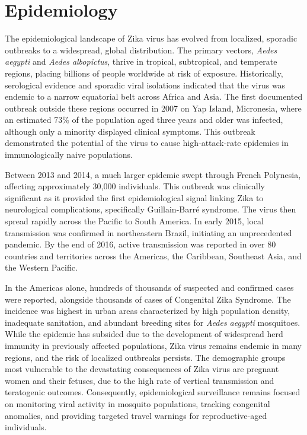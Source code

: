 \section*{Epidemiology}
The epidemiological landscape of Zika virus has evolved from localized, sporadic outbreaks to a widespread, global distribution. The primary vectors, \textit{Aedes aegypti} and \textit{Aedes albopictus}, thrive in tropical, subtropical, and temperate regions, placing billions of people worldwide at risk of exposure. Historically, serological evidence and sporadic viral isolations indicated that the virus was endemic to a narrow equatorial belt across Africa and Asia. The first documented outbreak outside these regions occurred in 2007 on Yap Island, Micronesia, where an estimated 73\% of the population aged three years and older was infected, although only a minority displayed clinical symptoms. This outbreak demonstrated the potential of the virus to cause high-attack-rate epidemics in immunologically naive populations.

Between 2013 and 2014, a much larger epidemic swept through French Polynesia, affecting approximately 30,000 individuals. This outbreak was clinically significant as it provided the first epidemiological signal linking Zika to neurological complications, specifically Guillain-Barr\'e syndrome. The virus then spread rapidly across the Pacific to South America. In early 2015, local transmission was confirmed in northeastern Brazil, initiating an unprecedented pandemic. By the end of 2016, active transmission was reported in over 80 countries and territories across the Americas, the Caribbean, Southeast Asia, and the Western Pacific.

In the Americas alone, hundreds of thousands of suspected and confirmed cases were reported, alongside thousands of cases of Congenital Zika Syndrome. The incidence was highest in urban areas characterized by high population density, inadequate sanitation, and abundant breeding sites for \textit{Aedes aegypti} mosquitoes. While the epidemic has subsided due to the development of widespread herd immunity in previously affected populations, Zika virus remains endemic in many regions, and the risk of localized outbreaks persists. The demographic groups most vulnerable to the devastating consequences of Zika virus are pregnant women and their fetuses, due to the high rate of vertical transmission and teratogenic outcomes. Consequently, epidemiological surveillance remains focused on monitoring viral activity in mosquito populations, tracking congenital anomalies, and providing targeted travel warnings for reproductive-aged individuals.

